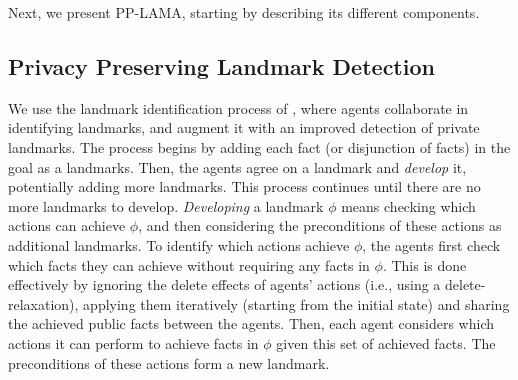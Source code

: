 \documentclass[letterpaper]{article}
\theoremstyle{definition}
\begin{document}
Next, we present PP-LAMA, starting by describing its different components. %


\subsection{Privacy Preserving Landmark Detection}
We use the landmark identification process of \cite{maliah2014privacyPreserving}, where agents collaborate in identifying landmarks, and augment it with an improved detection of private landmarks. 
The process begins by adding each fact (or disjunction of facts) in the goal as a landmarks. Then, the agents agree on a landmark and {\em develop} it, potentially adding more landmarks. This process continues until there are no more landmarks to develop. 
{\em Developing} a landmark $\phi$ means checking which actions can achieve $\phi$, and then considering the preconditions of these actions as additional landmarks. 
To identify which actions achieve $\phi$, the agents first check which facts they can achieve without requiring any facts in $\phi$. 
This is done effectively by ignoring the delete effects of agents' actions (i.e., using a delete-relaxation), applying them iteratively (starting from the initial state) and sharing the achieved public facts between the agents. Then, each agent considers which actions it can perform to achieve facts in $\phi$ given this set of achieved facts. The preconditions of these actions form a new landmark. 

\end{document}
